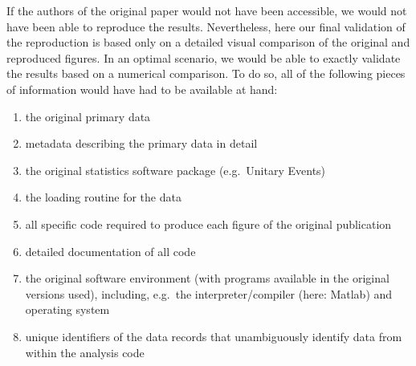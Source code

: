 \documentclass[10pt,a4paper,onecolumn]{article}
\begin{document}
If the authors of the original paper would not have been accessible, we
would not have been able to reproduce the results. Nevertheless, here
our final validation of the reproduction is based only on a detailed
visual comparison of the original and reproduced figures. In an optimal
scenario, we would be able to exactly validate the results based on a
numerical comparison. To do so, all of the following pieces of
information would have had to be available at hand:

\begin{enumerate}
\def\labelenumi{\arabic{enumi}.}
\item
  the original primary data
\item
  metadata describing the primary data in detail
\item
  the original statistics software package (e.g.~Unitary Events)
\item
  the loading routine for the data
\item
  all specific code required to produce each figure of the original
  publication
\item
  detailed documentation of all code
\item
  the original software environment (with programs available in the
  original versions used), including, e.g.~the interpreter/compiler
  (here: Matlab) and operating system
\item
  unique identifiers of the data records that unambiguously identify
  data from within the analysis code
\end{enumerate}
\end{document}
